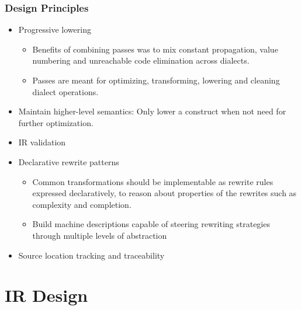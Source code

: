 \documentclass{beamer}
\begin{document}
\begin{frame}
  \footnotesize
  \frametitle{Design Principles}
  \begin{itemize}
    \itemsep0.5em
    \item Progressive lowering 
      \begin{itemize}
        \footnotesize
        \itemsep0.5em
        \item Benefits of combining passes was to mix constant propagation, value numbering and unreachable code elimination across dialects.
        \item Passes are meant for optimizing, transforming, lowering and cleaning dialect operations.
      \end{itemize}
    \item Maintain higher-level semantics: Only lower a construct when not need for further optimization.
    \item IR validation
    \item Declarative rewrite patterns
      \begin{itemize}
        \footnotesize
        \itemsep0.5em
        \item Common transformations should be implementable as rewrite rules expressed declaratively, to reason 
              about properties of the rewrites such as complexity and completion.
        \item Build machine descriptions capable of
        steering rewriting strategies through multiple levels of abstraction
      \end{itemize}
    \item Source location tracking and traceability
  \end{itemize}
\end{frame}

\section{IR Design}
\end{document}
